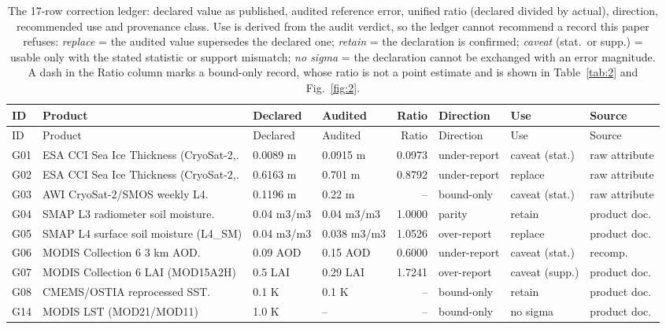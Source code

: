 \scriptsize
\setlength{\tabcolsep}{3pt}
\begin{longtable}{@{}l p{2.05cm} p{1.6cm} p{1.6cm} r p{1.25cm} p{1.4cm} p{1.35cm}@{}}
\caption{The 17-row correction ledger: declared value as published, audited reference error, unified ratio (declared divided by actual), direction, recommended use and provenance class. Use is derived from the audit verdict, so the ledger cannot recommend a record this paper refuses: \emph{replace} = the audited value supersedes the declared one; \emph{retain} = the declaration is confirmed; \emph{caveat} (stat.\ or supp.) = usable only with the stated statistic or support mismatch; \emph{no sigma} = the declaration cannot be exchanged with an error magnitude. A dash in the Ratio column marks a bound-only record, whose ratio is not a point estimate and is shown in Table~\ref{tab:2} and Fig.~\ref{fig:2}.}\label{tab:4}\\
\toprule
ID & Product & Declared & Audited & Ratio & Direction & Use & Source \\
\midrule
\endfirsthead
\toprule
ID & Product & Declared & Audited & Ratio & Direction & Use & Source \\
\midrule
\endhead
G01 & ESA CCI Sea Ice Thickness (CryoSat-2,. & 0.0089 m & 0.0915 m & 0.0973 & under-report & caveat (stat.) & raw attribute \\
G02 & ESA CCI Sea Ice Thickness (CryoSat-2,. & 0.6163 m & 0.701 m & 0.8792 & under-report & replace & raw attribute \\
G03 & AWI CryoSat-2\slash SMOS weekly L4. & 0.1196 m & 0.22 m & -- & bound-only & caveat (stat.) & raw attribute \\
G04 & SMAP L3 radiometer soil moisture. & 0.04 m3/m3 & 0.04 m3/m3 & 1.0000 & parity & retain & product doc. \\
G05 & SMAP L4 surface soil moisture (L4\_SM) & 0.04 m3/m3 & 0.038 m3/m3 & 1.0526 & over-report & replace & product doc. \\
G06 & MODIS Collection 6 3 km AOD. & 0.09 AOD & 0.15 AOD & 0.6000 & under-report & caveat (stat.) & recomp. \\
G07 & MODIS Collection 6 LAI (MOD15A2H) & 0.5 LAI & 0.29 LAI & 1.7241 & over-report & caveat (supp.) & product doc. \\
G08 & CMEMS\slash OSTIA reprocessed SST. & 0.1 K & 0.1 K & -- & bound-only & retain & product doc. \\
G14 & MODIS LST (MOD21\slash MOD11) & 1.0 K & -- & -- & bound-only & no sigma & product doc. \\

\end{longtable}
